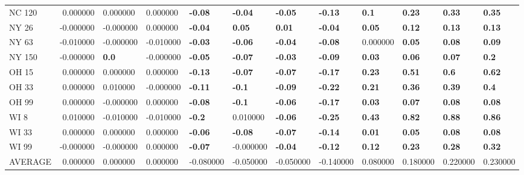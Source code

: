 \begin{tabular}{lrllllllllll}
NC 120 & 0.000000 & 0.000000 & 0.000000 & \textbf{-0.08} & \textbf{-0.04} & \textbf{-0.05} & \textbf{-0.13} & \textbf{0.1} & \textbf{0.23} & \textbf{0.33} & \textbf{0.35} \\
NY 26 & -0.000000 & -0.000000 & 0.000000 & \textbf{-0.04} & \textbf{0.05} & \textbf{0.01} & \textbf{-0.04} & \textbf{0.05} & \textbf{0.12} & \textbf{0.13} & \textbf{0.13} \\
NY 63 & -0.010000 & -0.000000 & -0.010000 & \textbf{-0.03} & \textbf{-0.06} & \textbf{-0.04} & \textbf{-0.08} & 0.000000 & \textbf{0.05} & \textbf{0.08} & \textbf{0.09} \\
NY 150 & -0.000000 & \textbf{0.0} & -0.000000 & \textbf{-0.05} & \textbf{-0.07} & \textbf{-0.03} & \textbf{-0.09} & \textbf{0.03} & \textbf{0.06} & \textbf{0.07} & \textbf{0.2} \\
OH 15 & 0.000000 & 0.000000 & 0.000000 & \textbf{-0.13} & \textbf{-0.07} & \textbf{-0.07} & \textbf{-0.17} & \textbf{0.23} & \textbf{0.51} & \textbf{0.6} & \textbf{0.62} \\
OH 33 & 0.000000 & 0.010000 & -0.000000 & \textbf{-0.11} & \textbf{-0.1} & \textbf{-0.09} & \textbf{-0.22} & \textbf{0.21} & \textbf{0.36} & \textbf{0.39} & \textbf{0.4} \\
OH 99 & 0.000000 & -0.000000 & 0.000000 & \textbf{-0.08} & \textbf{-0.1} & \textbf{-0.06} & \textbf{-0.17} & \textbf{0.03} & \textbf{0.07} & \textbf{0.08} & \textbf{0.08} \\
WI 8 & 0.010000 & -0.010000 & -0.010000 & \textbf{-0.2} & 0.010000 & \textbf{-0.06} & \textbf{-0.25} & \textbf{0.43} & \textbf{0.82} & \textbf{0.88} & \textbf{0.86} \\
WI 33 & 0.000000 & 0.000000 & 0.000000 & \textbf{-0.06} & \textbf{-0.08} & \textbf{-0.07} & \textbf{-0.14} & \textbf{0.01} & \textbf{0.05} & \textbf{0.08} & \textbf{0.08} \\
WI 99 & -0.000000 & -0.000000 & 0.000000 & \textbf{-0.07} & -0.000000 & \textbf{-0.04} & \textbf{-0.12} & \textbf{0.12} & \textbf{0.23} & \textbf{0.28} & \textbf{0.32} \\
AVERAGE & 0.000000 & 0.000000 & 0.000000 & -0.080000 & -0.050000 & -0.050000 & -0.140000 & 0.080000 & 0.180000 & 0.220000 & 0.230000 \\
\bottomrule
\end{tabular}
